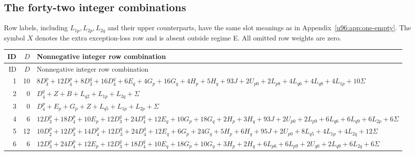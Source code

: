 \documentclass[11pt,a4paper]{article}
\theoremstyle{remark}
\begin{document}
\subsection{The forty-two integer combinations}
Row labels, including $L_{1p},L_{2p},L_{2q}$ and their upper counterparts,
have the same slot meanings as in Appendix~\ref{u96:app:one-empty}. The symbol
$X$ denotes the extra exception-loss row and is absent outside regime E.
All omitted row weights are zero.
\begingroup\footnotesize
\setlength{\tabcolsep}{4pt}
\renewcommand{\arraystretch}{1.35}
\begin{longtable}{rrp{13.8cm}}
\toprule
ID&$D$&Nonnegative integer row combination\\
\midrule
\endfirsthead
\toprule
ID&$D$&Nonnegative integer row combination\\
\midrule
\endhead
1&10&\( 8D_{3}^{p}+\allowbreak 12D_{4}^{p}+\allowbreak 8D_{3}^{q}+\allowbreak 16D_{4}^{q}+\allowbreak 6E_q+\allowbreak 4G_p+\allowbreak 16G_q+\allowbreak 4H_p+\allowbreak 5H_q+\allowbreak 93J+\allowbreak 2U_{p0}+\allowbreak 2L_{p8}+\allowbreak 4L_{q6}+\allowbreak 4L_{q8}+\allowbreak 4L_{1p}+\allowbreak 10\Sigma \)\\
2&0&\( D_{4}^{q}+\allowbreak Z+\allowbreak B+\allowbreak L_{q2}+\allowbreak L_{1p}+\allowbreak L_{2q}+\allowbreak \Sigma \)\\
3&0&\( D_{4}^{p}+\allowbreak E_p+\allowbreak G_p+\allowbreak Z+\allowbreak L_{q5}+\allowbreak L_{1p}+\allowbreak L_{2p}+\allowbreak \Sigma \)\\
4&6&\( 12D_{3}^{p}+\allowbreak 18D_{4}^{p}+\allowbreak 10E_p+\allowbreak 12D_{3}^{q}+\allowbreak 24D_{4}^{q}+\allowbreak 12E_q+\allowbreak 10G_p+\allowbreak 18G_q+\allowbreak 2H_p+\allowbreak 3H_q+\allowbreak 93J+\allowbreak 2U_{p0}+\allowbreak 2L_{p9}+\allowbreak 6L_{q6}+\allowbreak 6L_{q9}+\allowbreak 6L_{2p}+\allowbreak 6\Sigma \)\\
5&12&\( 10D_{2}^{p}+\allowbreak 12D_{3}^{p}+\allowbreak 14D_{4}^{p}+\allowbreak 12D_{3}^{q}+\allowbreak 24D_{4}^{q}+\allowbreak 12E_q+\allowbreak 6G_p+\allowbreak 24G_q+\allowbreak 5H_p+\allowbreak 6H_q+\allowbreak 95J+\allowbreak 2U_{p0}+\allowbreak 8L_{q5}+\allowbreak 4L_{1p}+\allowbreak 4L_{2q}+\allowbreak 12\Sigma \)\\
6&6&\( 12D_{3}^{p}+\allowbreak 24D_{4}^{p}+\allowbreak 12E_p+\allowbreak 12D_{3}^{q}+\allowbreak 18D_{4}^{q}+\allowbreak 10E_q+\allowbreak 18G_p+\allowbreak 10G_q+\allowbreak 3H_p+\allowbreak 2H_q+\allowbreak 6L_{p6}+\allowbreak 6L_{p9}+\allowbreak 2U_{q0}+\allowbreak 2L_{q9}+\allowbreak 6L_{2q}+\allowbreak 6\Sigma \)\\

\end{longtable}
\end{document}
